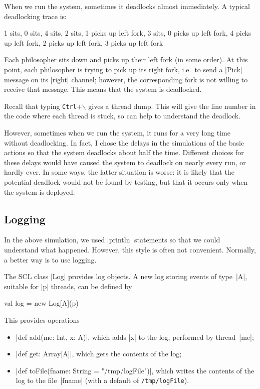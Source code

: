 When we run the system, sometimes it deadlocks almost immediately.  A typical
deadlocking trace is:
%
\begin{scala}
1 sits,  0 sits,  4 sits,  2 sits,  1 picks up left fork, 3 sits,  0 picks up left fork,  
4 picks up left fork, 2 picks up left fork,  3 picks up left fork
\end{scala}
%
Each philosopher sits down and picks up their left fork (in some order).  At
this point, each philosopher is trying to pick up its right fork, i.e.~to send
a |Pick| message on its |right| channel; however, the corresponding fork is
not willing to receive that message.  This means that the system is
deadlocked.

Recall that typing \texttt{Ctrl}+$\backslash$ gives a thread dump.  This will
give the line number in the code where each thread is stuck, so can help to
understand the deadlock.   

However, sometimes when we run the system, it runs for a very long time
without deadlocking.  In fact, I chose the delays in the simulations of the
basic actions so that the system deadlocks about half the time.  Different
choices for these delays would have caused the system to deadlock on nearly
every run, or hardly ever.  In some ways, the latter situation is worse: it is
likely that the potential deadlock would not be found by testing, but that it
occurs only when the system is deployed.


\subsection{Logging}

In the above simulation, we used |println| statements so that we could
understand what happened.  However, this style is often not convenient.
Normally, a better way is to use logging.

The SCL class |Log| provides log objects.
%
A new log storing events of type~|A|, suitable for |p| threads,
can be defined by
\begin{scala}
  val log = new Log[A](p)
\end{scala}
%
This provides operations
%
\begin{itemize}
\item |def add(me: Int, x: A)|, which adds |x| to the log,
performed by thread~|me|;

\item |def get: Array[A]|, which gets the contents of the log;

\item |def toFile(fname: String = "/tmp/logFile")|, which writes the contents
  of the log to the file~|fname| (with a default of \texttt{/tmp/logFile}).
\end{itemize}


